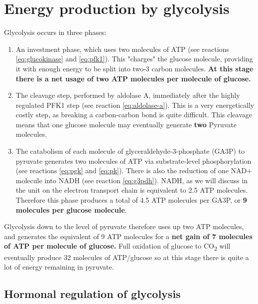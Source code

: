 \documentclass{tufte-handout}
\begin{document}
\section{Energy production by glycolysis}

Glycolysis occurs in three phases:

\begin{enumerate}
\item An investment phase, which uses two molecules of ATP (see reactions \ref{eq:glucokinase} and \ref{eq:pfk1}).  This "charges" the glucose molecule, providing it with enough energy to be split into two-3 carbon molecules.  \textbf{At this stage there is a net usage of two ATP molecules per molecule of glucose.}
\item The cleavage step, performed by aldolase A, immediately after the highly regulated PFK1 step (see reaction \ref{eq:aldolase-a}).  This is a very energetically costly step, as breaking a carbon-carbon bond is quite difficult.  This cleavage means that one glucose molecule may eventually generate \textbf{two} Pyruvate molecules.
\item The catabolism of each molecule of glyceraldehyde-3-phosphate (GA3P) to pyruvate generates two molecules of ATP via substrate-level phosphorylation (see reactions \ref{eq:pgk} and \ref{eq:pk}).  There is also the reduction of one NAD+ molecule into NADH (see reaction \ref{eq:g3pdh}).  NADH, as we will discuss in the unit on the electron transport chain is equivalent to 2.5 ATP molecules.  Therefore this phase produces a total of 4.5 ATP molecules per GA3P, or \textbf{9 molecules per glucose molecule}.
\end{enumerate}

Glycolysis down to the level of pyruvate therefore uses up two ATP molecules, and generates the equivalent of 9 ATP molecules for a \textbf{net gain of 7 molecules of ATP per molecule of glucose.}  Full oxidation of glucose to CO\textsubscript{2} will eventually produce 32 molecules of ATP/glucose so at this stage there is quite a lot of energy remaining in pyruvate.

\subsection{Hormonal regulation of glycolysis}
\end{document}
